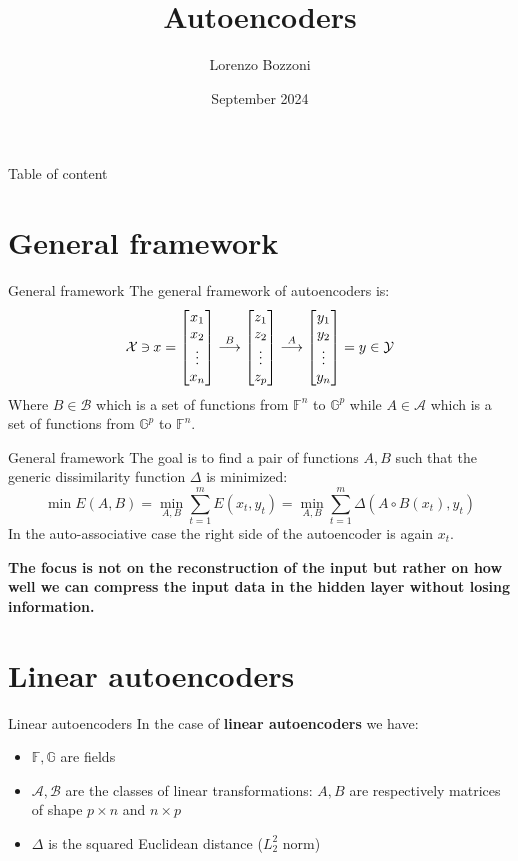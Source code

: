 \documentclass{beamer}
\title{Autoencoders}
\author{Lorenzo Bozzoni}
\institute{Politecnico di Milano}
\date{September 2024}
\newcommand{\revin}{\mathbin{\rotatebox[origin=c]{180}{$\in$}}}
\begin{document}
\frame{\titlepage}



\begin{frame}{Table of content}
    \tableofcontents
\end{frame}


\section{General framework}
\begin{frame}{General framework}
The general framework of autoencoders is:
\[
\mathcal{X} \revin x = 
\begin{bmatrix}
    x_1\\
    x_2\\
    \vdots\\
    x_n
\end{bmatrix}
\overset{B}{\longrightarrow}
\begin{bmatrix}
    z_1\\
    z_2\\
    \vdots\\
    z_p
\end{bmatrix}
\overset{A}{\longrightarrow}
\begin{bmatrix}
    y_1\\
    y_2\\
    \vdots\\
    y_n
\end{bmatrix}
= y \in \mathcal{Y}
\]
Where $B \in \mathcal{B}$ which is a set of functions from $\mathbb{F}^n$ to $\mathbb{G}^p$ while $A \in \mathcal{A}$ which is a set of functions from $\mathbb{G}^p$ to $\mathbb{F}^n$.
\end{frame}

\begin{frame}{General framework}
The goal is to find a pair of functions $A,B$ such that the generic dissimilarity function $\Delta$ is minimized:
\[
\min E(A,B) = \min_{A,B} \sum_{t=1}^m E(x_t,y_t) = \min_{A,B} \sum_{t=1}^m \Delta(A \circ B(x_t),y_t)  
\]
In the auto-associative case the right side of the autoencoder is again $x_t$.

\textbf{The focus is not on the reconstruction of the input but rather on how well we can compress the input data in the hidden layer without losing information.}
\end{frame}


\section{Linear autoencoders}
\begin{frame}{Linear autoencoders}
In the case of \textbf{linear autoencoders} we have:
\begin{itemize}
    \item $\mathbb{F},\mathbb{G}$ are fields
    \item $\mathcal{A},\mathcal{B}$ are the classes of linear transformations: $A,B$ are respectively matrices of shape $p \times n$ and $n \times p$
    \item $\Delta$ is the squared Euclidean distance ($L_2^2$ norm)
\end{itemize}
\end{frame}
\end{document}
